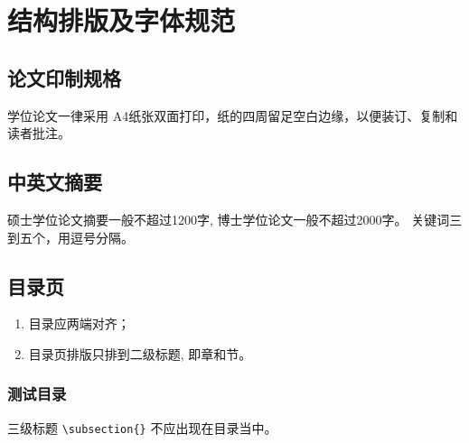 
\chapter{结构排版及字体规范}
\section{论文印制规格}
学位论文一律采用 A4纸张双面打印，纸的四周留足空白边缘，以便装订、复制和读者批注。

\section{中英文摘要}
硕士学位论文摘要一般不超过1200字, 博士学位论文一般不超过2000字。
关键词三到五个，用逗号分隔。

\section{目录页}
\begin{enumerate}
    \item 目录应两端对齐；
    \item 目录页排版只排到二级标题, 即章和节。
\end{enumerate}

\subsection{测试目录}
三级标题 \verb|\subsection{}| 不应出现在目录当中。

